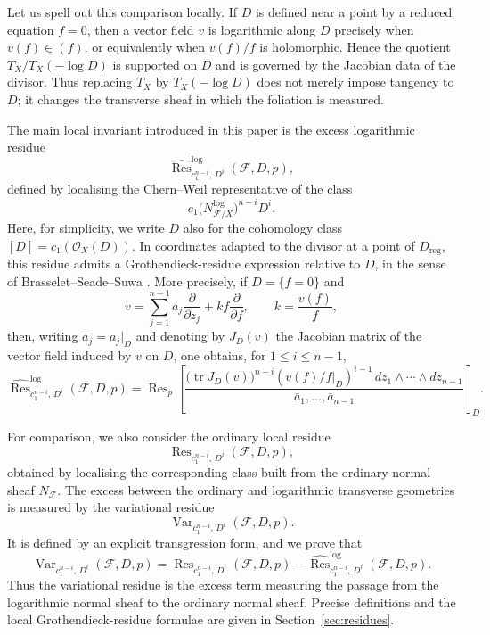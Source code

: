 \documentclass[12pt,reqno,a4paper]{amsart}
\numberwithin{equation}{section}
\theoremstyle{plain}
\theoremstyle{definition}
\newcommand{\cO}{\mathcal{O}}
\newcommand{\cF}{\mathcal{F}}
\begin{document}
Let us spell out this comparison locally. If \(D\) is defined near a point by a
reduced equation \(f=0\), then a vector field \(v\) is logarithmic along \(D\)
precisely when \(v(f)\in(f)\), or equivalently when \(v(f)/f\) is holomorphic.
Hence the quotient \(T_X/T_X(-\log D)\) is supported on \(D\) and is governed by
the Jacobian data of the divisor. Thus replacing \(T_X\) by \(T_X(-\log D)\)
does not merely impose tangency to \(D\); it changes the transverse sheaf in
which the foliation is measured.

The main local invariant introduced in this paper is the excess logarithmic
residue
\[
\widehat{\operatorname{Res}}^{\log}_{c_1^{n-i},\,D^i}(\cF,D,p),
\]
defined by localising the Chern--Weil representative of the class
\[
c_1\bigl(N_{\cF/X}^{\log}\bigr)^{n-i}D^i.
\]
Here, for simplicity, we write \(D\) also for the cohomology class
\([D]=c_1(\cO_X(D))\). In coordinates adapted to the divisor at a point of
\(D_{\mathrm{reg}}\), this residue admits a Grothendieck-residue expression
relative to \(D\), in the sense of Brasselet--Seade--Suwa
\cite[\S~6.3]{BrSeSu}. More precisely, if \(D=\{f=0\}\) and
\[
v=
\sum_{j=1}^{n-1}a_j\frac{\partial}{\partial z_j}
+
kf\frac{\partial}{\partial f},
\qquad k=\frac{v(f)}{f},
\]
then, writing \(\bar a_j=a_j|_D\) and denoting by \(J_D(v)\) the Jacobian
matrix of the vector field induced by \(v\) on \(D\), one obtains, for
\(1\leq i\leq n-1\),
\[
\widehat{\operatorname{Res}}^{\log}_{c_1^{n-i},\,D^i}(\cF,D,p)
=
\operatorname{Res}_{p}
\left[
\frac{
\bigl(\operatorname{tr}J_D(v)\bigr)^{n-i}
\left(\left. v(f)/f\right|_D\right)^{i-1}
\,dz_1\wedge\cdots\wedge dz_{n-1}
}
{\bar a_1,\ldots,\bar a_{n-1}}
\right]_{D}.
\]

For comparison, we also consider the ordinary local residue
\[
\operatorname{Res}_{c_1^{n-i},\,D^i}(\cF,D,p),
\]
obtained by localising the corresponding class built from the ordinary normal
sheaf \(N_{\cF}\). The excess between the ordinary and logarithmic transverse
geometries is measured by the variational residue
\[
\operatorname{Var}_{c_1^{n-i},\,D^i}(\cF,D,p).
\]
It is defined by an explicit transgression form, and we prove that
\[
\operatorname{Var}_{c_1^{n-i},\,D^i}(\cF,D,p)
=
\operatorname{Res}_{c_1^{n-i},\,D^i}(\cF,D,p)
-
\widehat{\operatorname{Res}}^{\log}_{c_1^{n-i},\,D^i}(\cF,D,p).
\]
Thus the variational residue is the excess term measuring the passage from the
logarithmic normal sheaf to the ordinary normal sheaf. Precise definitions and
the local Grothendieck-residue formulae are given in
Section~\ref{sec:residues}.
\end{document}

